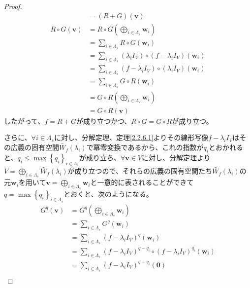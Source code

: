 \documentclass[dvipdfmx]{jsarticle}
\begin{document}
\begin{proof}
\begin{align*}
&= (R + G)\left( \mathbf{v} \right) \\
R \circ G\left( \mathbf{v} \right) &= R \circ G\left( \bigoplus_{i \in \varLambda_{s}} \mathbf{w}_{i} \right) \\
&= \sum_{i \in \varLambda_{s}} {R \circ G\left( \mathbf{w}_{i} \right)} \\
&= \sum_{i \in \varLambda_{s}} {\left( \lambda_{i}I_{V} \right) \circ \left( f - \lambda_{i}I_{V} \right)\left( \mathbf{w}_{i} \right)} \\
&= \sum_{i \in \varLambda_{s}} {\left( f - \lambda_{i}I_{V} \right) \circ \left( \lambda_{i}I_{V} \right)\left( \mathbf{w}_{i} \right)} \\
&= \sum_{i \in \varLambda_{s}} {G \circ R\left( \mathbf{w}_{i} \right)} \\
&= G \circ R\left( \bigoplus_{i \in \varLambda_{s}} \mathbf{w}_{i} \right) \\
&= G \circ R\left( \mathbf{v} \right)
\end{align*}
したがって、$f = R + G$が成り立つかつ、$R \circ G = G \circ R$が成り立つ。\par
さらに、$\forall i \in \varLambda_{s}$に対し、分解定理、定理\ref{2.2.6.1}よりその線形写像$f - \lambda_{i}I_{V}$はその広義の固有空間$\widetilde{W_{f}}\left( \lambda_{i} \right)$で冪零変換であるから、これの指数が$q_{i}$とおかれると、$q_{i} \leq \max\left\{ q_{i} \right\}_{i \in \varLambda_{s}}$が成り立ち、$\forall\mathbf{v} \in V$に対し、分解定理より$V = \bigoplus_{i \in \varLambda_{s}} {\widetilde{W_{f}}\left( \lambda_{i} \right)}$が成り立つので、それらの広義の固有空間たち$\widetilde{W_{f}}\left( \lambda_{i} \right)$の元$\mathbf{w}_{i}$を用いて$\mathbf{v} = \bigoplus_{i \in \varLambda_{s}} \mathbf{w}_{i}$と一意的に表されることができて$q = \max\left\{ q_{i} \right\}_{i \in \varLambda_{s}}$とおくと、次のようになる。
\begin{align*}
G^{q}\left( \mathbf{v} \right) &= G^{q}\left( \bigoplus_{i \in \varLambda_{s}} \mathbf{w}_{i} \right) \\
&= \sum_{i \in \varLambda_{s}} {G^{q}\left( \mathbf{w}_{i} \right)} \\
&= \sum_{i \in \varLambda_{s}} {\left( f - \lambda_{i}I_{V} \right)^{q}\left( \mathbf{w}_{i} \right)} \\
&= \sum_{i \in \varLambda_{s}} {\left( f - \lambda_{i}I_{V} \right)^{q - q_{i}} \circ \left( f - \lambda_{i}I_{V} \right)^{q_{i}}\left( \mathbf{w}_{i} \right)} \\
&= \sum_{i \in \varLambda_{s}} {\left( f - \lambda_{i}I_{V} \right)^{q - q_{i}}\left( \mathbf{0} \right)} \\

\end{align*}
\end{proof}
\end{document}
